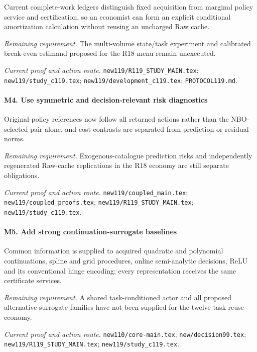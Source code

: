 Current complete-work ledgers distinguish fixed acquisition from marginal policy service and certification, so an economist can form an explicit conditional amortization calculation without reusing an uncharged Raw cache.

\par\emph{Remaining requirement.} The multi-volume state/\allowbreak{}task experiment and calibrated break-even estimand proposed for the R18 menu remain unexecuted.

\par\emph{Current proof and action route.} \nolinkurl{new119/R119_STUDY_MAIN.tex}; \nolinkurl{new119/study_c119.tex}; \nolinkurl{new119/development_c119.tex}; \nolinkurl{PROTOCOL119.md}.

\paragraph{M4. Use symmetric and decision-relevant risk diagnostics}

Original-policy references now follow all returned actions rather than the NBO-selected pair alone, and cost contrasts are separated from prediction or residual norms.

\par\emph{Remaining requirement.} Exogenous-catalogue prediction risks and independently regenerated Raw-cache replications in the R18 economy are still separate obligations.

\par\emph{Current proof and action route.} \nolinkurl{new119/coupled_main.tex}; \nolinkurl{new119/coupled_proofs.tex}; \nolinkurl{new119/R119_STUDY_MAIN.tex}; \nolinkurl{new119/study_c119.tex}.

\paragraph{M5. Add strong continuation-surrogate baselines}

Common information is supplied to acquired quadratic and polynomial continuations, spline and grid procedures, online semi-analytic decisions, ReLU and its conventional hinge encoding; every representation receives the same certificate services.

\par\emph{Remaining requirement.} A shared task-conditioned actor and all proposed alternative surrogate families have not been supplied for the twelve-task reuse economy.

\par\emph{Current proof and action route.} \nolinkurl{new110/core-main.tex}; \nolinkurl{new/decision99.tex}; \nolinkurl{new119/R119_STUDY_MAIN.tex}; \nolinkurl{new119/study_c119.tex}.

